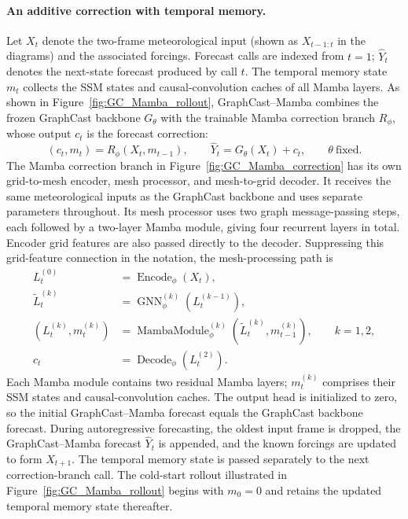 \documentclass{article}
\begin{document}
\paragraph{An additive correction with temporal memory.}
Let $X_t$ denote the two-frame meteorological input (shown as $X_{t-1:t}$ in the diagrams) and the associated forcings. Forecast calls are indexed from $t=1$; $\hat{Y}_t$ denotes the next-state forecast produced by call $t$. The temporal memory state $m_t$ collects the SSM states and causal-convolution caches of all Mamba layers. As shown in Figure~\ref{fig:GC_Mamba_rollout}, {GraphCast--Mamba combines the frozen GraphCast backbone $G_\theta$ with the trainable Mamba correction branch $R_\phi$, whose output $c_t$ is the forecast correction}:
\vspace{-4pt}
\begin{equation}
    (c_t,m_t)=R_\phi(X_t,m_{t-1}),
    \qquad
    \hat{Y}_t=G_\theta(X_t)+c_t,
    \qquad \theta\ \text{fixed}.
    \label{eq:additive_correction}
\end{equation}
{The Mamba correction branch in Figure~\ref{fig:GC_Mamba_correction}} has its own grid-to-mesh encoder, mesh processor, and mesh-to-grid decoder. It receives {the same meteorological inputs as the GraphCast backbone} and uses separate parameters throughout. Its mesh processor uses two graph message-passing steps, each followed by a two-layer Mamba module, giving four recurrent layers in total. Encoder grid features are also passed directly to the decoder. Suppressing this grid-feature connection in the notation, the mesh-processing path is
\begin{align}
    L_t^{(0)} &= \operatorname{Encode}_\phi(X_t),\\
    \widetilde{L}_t^{(k)} &= \operatorname{GNN}^{(k)}_\phi(L_t^{(k-1)}),\\
    (L_t^{(k)},m_t^{(k)})
    &=\operatorname{MambaModule}^{(k)}_\phi
       (\widetilde{L}_t^{(k)},m_{t-1}^{(k)}),\qquad k=1,2,\\
    c_t &= \operatorname{Decode}_\phi(L_t^{(2)}).
\end{align}
{Each Mamba module contains two residual Mamba layers; $m_t^{(k)}$ comprises their SSM states and causal-convolution caches.} The output head is initialized to zero, so {the initial GraphCast--Mamba forecast equals the GraphCast backbone forecast}. During autoregressive forecasting, the oldest input frame is dropped, {the GraphCast--Mamba forecast $\hat{Y}_t$ is appended}, and the known forcings are updated to form $X_{t+1}$. {The temporal memory state is passed separately to the next correction-branch call.} The cold-start rollout illustrated in Figure~\ref{fig:GC_Mamba_rollout} begins with $m_0=0$ and {retains the updated temporal memory state thereafter}.
\end{document}
